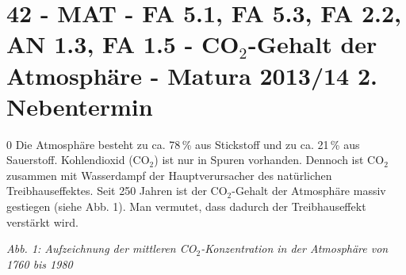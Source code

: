 \section{42 - MAT - FA 5.1, FA 5.3, FA 2.2, AN 1.3, FA 1.5 - CO$_2$-Gehalt der Atmosphäre - Matura 2013/14 2. Nebentermin}

\begin{langesbeispiel} \item[0] %
				 Die Atmosphäre besteht zu ca. 78\,\% aus Stickstoff und zu ca. 21\,\% aus Sauerstoff. Kohlendioxid (CO$_2$) ist nur in Spuren vorhanden. Dennoch ist CO$_2$ zusammen mit Wasserdampf der Hauptverursacher des natürlichen Treibhauseffektes. Seit 250 Jahren ist der CO$_2$-Gehalt der Atmosphäre massiv gestiegen (siehe Abb. 1). Man vermutet, dass dadurch der Treibhauseffekt verstärkt wird.

	\begin{center}
	\end{center}
	\begin{footnotesize}\textit{Abb. 1: Aufzeichnung der mittleren CO$_2$-Konzentration in der Atmosphäre von 1760 bis 1980}\end{footnotesize}
	

\end{langesbeispiel}
